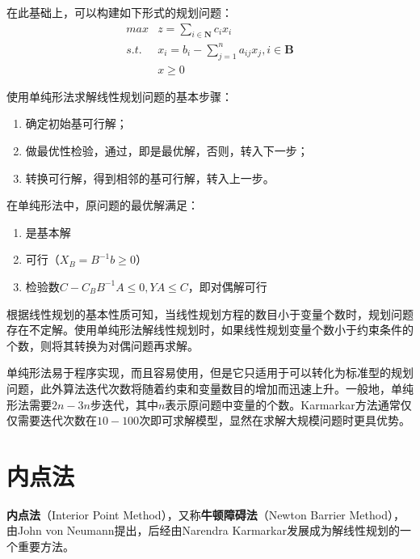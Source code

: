 在此基础上，可以构建如下形式的规划问题：
\begin{equation}
  \begin{array}{ll}
  \textit{max} & z= \sum\limits_{i\in \textbf{N}}{c_ix_i} \\
  \textit{s.t.} & x_i = b_i - \sum_{j = 1}^n{a_{ij}x_j} ,i\in \textbf{B}\\
  & x \ge 0
  \end{array}
\end{equation}

使用单纯形法求解线性规划问题的基本步骤：
\begin{enumerate}[（1）]
  \item 确定初始基可行解；
  \item 做最优性检验，通过，即是最优解，否则，转入下一步；
  \item 转换可行解，得到相邻的基可行解，转入上一步。
\end{enumerate}

在单纯形法中，原问题的最优解满足：
\begin{enumerate}[（1）]
  \item 是基本解
  \item 可行（$X_B = B^{-1}b\ge 0$）
  \item 检验数$C - C_BB^{-1}A\le 0, YA\le C$，即对偶解可行
\end{enumerate}

根据线性规划的基本性质可知，当线性规划方程的数目小于变量个数时，规划问题存在不定解。使用单纯形法解线性规划时，如果线性规划变量个数小于约束条件的个数，则将其转换为对偶问题再求解。

单纯形法易于程序实现，而且容易使用，但是它只适用于可以转化为标准型的规划问题，此外算法迭代次数将随着约束和变量数目的增加而迅速上升。一般地，单纯形法需要$2n-3n$步迭代，其中$n$表示原问题中变量的个数。Karmarkar方法通常仅仅需要迭代次数在$10-100$次即可求解模型，显然在求解大规模问题时更具优势。

\section{内点法}
\textbf{内点法}（Interior Point Method），又称\textbf{牛顿障碍法}（Newton Barrier Method），由John von Neumann提出，后经由Narendra Karmarkar发展成为解线性规划的一个重要方法。

